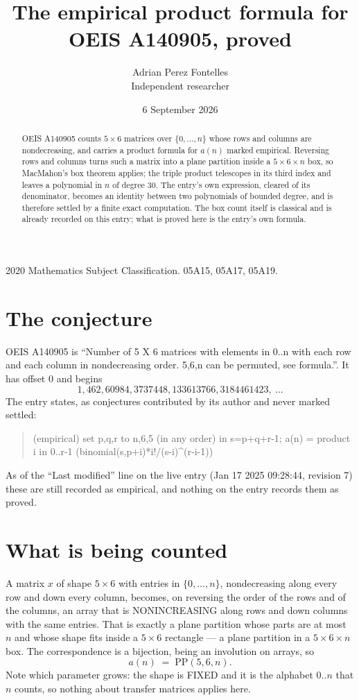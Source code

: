 \documentclass[11pt,a4paper]{article}
\title{The empirical product formula for OEIS A140905, proved}
\author{Adrian Perez Fontelles\\ \small Independent researcher}
\date{6 September 2026}
\theoremstyle{plain}
\theoremstyle{definition}
\begin{document}
\maketitle

\begin{abstract}
OEIS A140905 counts $5\times6$ matrices over $\{0,\dots,n\}$ whose rows and columns are
nondecreasing, and carries a product formula for $a(n)$ marked empirical. Reversing rows and
columns turns such a matrix into a plane partition inside a $5\times6\times n$ box, so
MacMahon's box theorem applies; the triple product telescopes in its third index and leaves a
polynomial in $n$ of degree $30$. The entry's own expression, cleared of its denominator,
becomes an identity between two polynomials of bounded degree, and is therefore settled by a
finite exact computation. The box count itself is classical and is already recorded on this
entry; what is proved here is the entry's own formula.
\end{abstract}

\noindent\small 2020 Mathematics Subject Classification. 05A15, 05A17, 05A19.\normalsize

\section{The conjecture}

OEIS A140905 is ``Number of 5 X 6 matrices with elements in 0..n with each row and each column in nondecreasing order. 5,6,n can be permuted, see formula.''. It has offset $0$ and begins
\[
1, 462, 60984, 3737448, 133613766, 3184461423,\ \dots
\]
The entry states, as conjectures contributed by its author and never marked settled:
\begin{quote}
(empirical) set p,q,r to n,6,5 (in any order) in s=p+q+r-1; a(n) = product {i in 0..r-1} (binomial(s,p+i)*i!/(s-i)\^{}(r-i-1))

\end{quote}
As of the ``Last modified'' line on the live entry (Jan 17 2025 09:28:44, revision 7) these are still
recorded as empirical, and nothing on the entry records them as proved.

\section{What is being counted}

A matrix $x$ of shape $5\times6$ with entries in $\{0,\dots,n\}$, nondecreasing along
every row and down every column, becomes, on reversing the order of the rows and of the
columns, an array that is NONINCREASING along rows and down columns with the same entries. That
is exactly a plane partition whose parts are at most $n$ and whose shape fits inside a
$5\times6$ rectangle --- a plane partition in a $5\times6\times n$ box. The
correspondence is a bijection, being an involution on arrays, so
\[
a(n)\;=\;\mathrm{PP}(5,6,n).
\]
Note which parameter grows: the shape is FIXED and it is the alphabet $0..n$ that $n$ counts,
so nothing about transfer matrices applies here.
\end{document}
